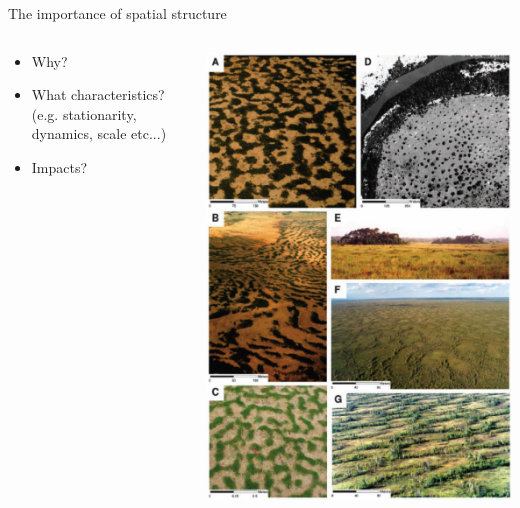 \documentclass{eecslides}
\begin{document}
	\begin{frame}{The importance of spatial structure}

		\begin{columns}
			\begin{column}{0.4\textwidth}
			\begin{itemize}
				\item Why?
				\item What characteristics? (e.g. stationarity, dynamics, scale etc...)
				\item Impacts?
			\end{itemize}	
			\end{column}
			\begin{column}{0.6\textwidth}
				\begin{center}
					\includegraphics[height=0.7\textheight]{rietkerk}
				\end{center}
			\end{column}
		\end{columns}	 

	\end{frame}
\end{document}
